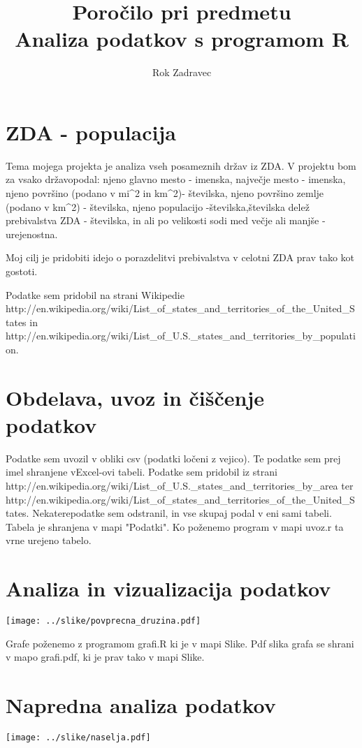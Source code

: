 \documentclass[11pt,a4paper]{article}
\begin{document}
\title{Poročilo pri predmetu \\
Analiza podatkov s programom R}
\author{Rok Zadravec}
\maketitle

\section{ZDA - populacija}

Tema mojega projekta je analiza vseh posameznih držav iz ZDA. V projektu bom za vsako državo\n podal: njeno glavno mesto - imenska, največje mesto - imenska, njeno površino (podano v mi^2 in km^2)\n - številska, njeno površino zemlje (podano v km^2) - številska, njeno populacijo -številska,\n številska delež prebivalstva ZDA  - številska, in ali po velikosti sodi med večje ali manjše\n
- urejenostna.

Moj cilj je pridobiti idejo o porazdelitvi prebivalstva v celotni ZDA prav tako kot gostoti.

Podatke sem pridobil na strani Wikipedie http://en.wikipedia.org/wiki/List_of_states_and_territories_of_the_United_States in 
http://en.wikipedia.org/wiki/List_of_U.S._states_and_territories_by_population.

\section{Obdelava, uvoz in čiščenje podatkov}

Podatke sem uvozil v obliki csv (podatki ločeni z vejico). Te podatke sem prej imel shranjene v\n Excel-ovi tabeli. Podatke sem\n 
pridobil iz strani http://en.wikipedia.org/wiki/List_of_U.S._states_and_territories_by_area ter\n 
http://en.wikipedia.org/wiki/List_of_states_and_territories_of_the_United_States. Nekatere\n podatke sem odstranil, in vse skupaj podal v eni sami tabeli. Tabela je shranjena v mapi "Podatki".\n
Ko poženemo program v mapi uvoz.r ta vrne urejeno tabelo.\n

\section{Analiza in vizualizacija podatkov}

\texttt{[image: ../slike/povprecna\_druzina.pdf]}

Grafe poženemo z programom grafi.R ki je v mapi Slike. Pdf slika grafa se shrani v mapo\n
grafi.pdf,  ki je prav tako v mapi Slike.\n

\section{Napredna analiza podatkov}

\texttt{[image: ../slike/naselja.pdf]}
\end{document}
